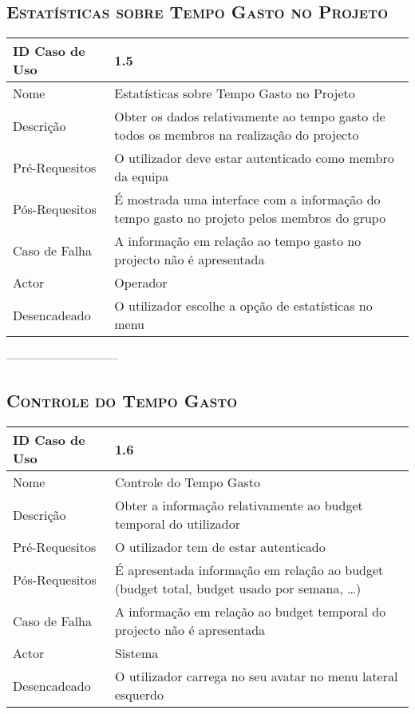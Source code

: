 \documentclass[12pt]{article}
\begin{document}
\subsection{ \textsc{Estatísticas sobre Tempo Gasto no Projeto}}

\begin{center}
\begin{tabular}{ | m{4cm} | m{10cm} | } 
\hline
ID Caso de Uso & 1.5\\
\hline
Nome & Estatísticas sobre Tempo Gasto no Projeto\\
\hline
Descrição & Obter os dados relativamente ao tempo gasto de todos os membros na realização do projecto \\
\hline
Pré-Requesitos & O utilizador deve estar autenticado como membro da equipa\\
\hline
Pós-Requesitos & É mostrada uma interface com a informação do tempo gasto no projeto pelos membros do grupo\\
\hline
Caso de Falha & A informação em relação ao tempo gasto no projecto não é apresentada\\
\hline
Actor & Operador\\
\hline
Desencadeado & O utilizador escolhe a opção de estatísticas no menu\\
\hline
\end{tabular}
\end{center}
------------------------------

\subsection{ \textsc{Controle do Tempo Gasto}}

\begin{center}
\begin{tabular}{ | m{4cm} | m{10cm} | } 
\hline
ID Caso de Uso & 1.6\\
\hline
Nome & Controle do Tempo Gasto\\
\hline
Descrição & Obter a informação relativamente ao budget temporal do utilizador\\
\hline
Pré-Requesitos & O utilizador tem de estar autenticado\\
\hline
Pós-Requesitos & É apresentada informação em relação ao budget (budget total, budget usado por semana, …)\\
\hline
Caso de Falha & A informação em relação ao budget temporal do projecto não é apresentada\\
\hline
Actor & Sistema\\
\hline
Desencadeado & O utilizador carrega no seu avatar no menu lateral esquerdo\\
\hline
\end{tabular}
\end{center}
\end{document}
